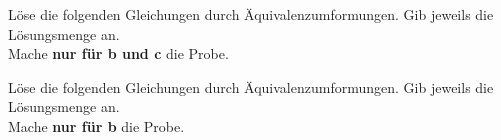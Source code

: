 \documentclass[addpoints,a4paper,ngerman,12pt]{exam}
\newcommand{\lsgend}{\end{solutionorgrid}}
\newcommand{\lsg}[1][1]{\begin{solutionorgrid}[\stretch{#1}]}
\newcommand{\seitenwechsel}{\ifthenelse{\equal{\mitlsg}{ja}}{}{\newpage}}
\begin{document}
	\schrift
	\parindent0cm
	\ifprintanswers 	\else 	\vspace*{-15mm}\hrulefill	\fi


	\begin{questions}
\question[8] Löse die folgenden Gleichungen durch Äquivalenzumformungen. Gib jeweils die Lösungsmenge an.\\ Mache \textbf{nur für b und c} die Probe.
\seitenwechsel
\question[8] Löse die folgenden Gleichungen durch Äquivalenzumformungen. Gib jeweils die Lösungsmenge an.\\ Mache \textbf{nur für b} die Probe.
\begin{parts}

\end{parts}
\end{questions}
\end{document}
